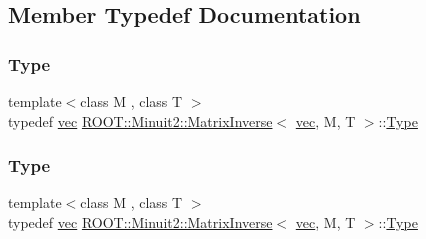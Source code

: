 \subsection{Member Typedef Documentation}
\mbox{\label{classROOT_1_1Minuit2_1_1MatrixInverse_3_01vec_00_01M_00_01T_01_4_ae925e39424dcc097f76d033365b06efd}} 
\subsubsection{\texorpdfstring{Type}{Type}\hspace{0.1cm}{\footnotesize\ttfamily [1/3]}}
{\footnotesize\ttfamily template$<$class M , class T $>$ \\
typedef \mbox{\hyperlink{classROOT_1_1Minuit2_1_1vec}{vec}} \mbox{\hyperlink{classROOT_1_1Minuit2_1_1MatrixInverse}{R\+O\+O\+T\+::\+Minuit2\+::\+Matrix\+Inverse}}$<$ \mbox{\hyperlink{classROOT_1_1Minuit2_1_1vec}{vec}}, M, T $>$\+::\mbox{\hyperlink{classROOT_1_1Minuit2_1_1MatrixInverse_3_01vec_00_01M_00_01T_01_4_ae925e39424dcc097f76d033365b06efd}{Type}}}

\mbox{\label{classROOT_1_1Minuit2_1_1MatrixInverse_3_01vec_00_01M_00_01T_01_4_ae925e39424dcc097f76d033365b06efd}} 
\subsubsection{\texorpdfstring{Type}{Type}\hspace{0.1cm}{\footnotesize\ttfamily [2/3]}}
{\footnotesize\ttfamily template$<$class M , class T $>$ \\
typedef \mbox{\hyperlink{classROOT_1_1Minuit2_1_1vec}{vec}} \mbox{\hyperlink{classROOT_1_1Minuit2_1_1MatrixInverse}{R\+O\+O\+T\+::\+Minuit2\+::\+Matrix\+Inverse}}$<$ \mbox{\hyperlink{classROOT_1_1Minuit2_1_1vec}{vec}}, M, T $>$\+::\mbox{\hyperlink{classROOT_1_1Minuit2_1_1MatrixInverse_3_01vec_00_01M_00_01T_01_4_ae925e39424dcc097f76d033365b06efd}{Type}}}

